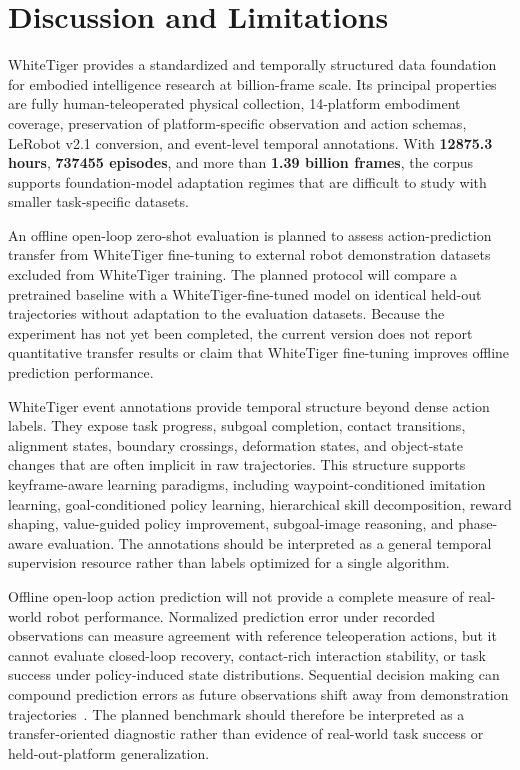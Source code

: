 \section{Discussion and Limitations}

WhiteTiger provides a standardized and temporally structured data foundation for embodied intelligence research at billion-frame scale. Its principal properties are fully human-teleoperated physical collection, 14-platform embodiment coverage, preservation of platform-specific observation and action schemas, LeRobot v2.1 conversion, and event-level temporal annotations. With \textbf{12875.3 hours}, \textbf{737455 episodes}, and more than \textbf{1.39 billion frames}, the corpus supports foundation-model adaptation regimes that are difficult to study with smaller task-specific datasets.

An offline open-loop zero-shot evaluation is planned to assess action-prediction transfer from WhiteTiger fine-tuning to external robot demonstration datasets excluded from WhiteTiger training. The planned protocol will compare a pretrained baseline with a WhiteTiger-fine-tuned model on identical held-out trajectories without adaptation to the evaluation datasets. Because the experiment has not yet been completed, the current version does not report quantitative transfer results or claim that WhiteTiger fine-tuning improves offline prediction performance.

WhiteTiger event annotations provide temporal structure beyond dense action labels. They expose task progress, subgoal completion, contact transitions, alignment states, boundary crossings, deformation states, and object-state changes that are often implicit in raw trajectories. This structure supports keyframe-aware learning paradigms, including waypoint-conditioned imitation learning, goal-conditioned policy learning, hierarchical skill decomposition, reward shaping, value-guided policy improvement, subgoal-image reasoning, and phase-aware evaluation. The annotations should be interpreted as a general temporal supervision resource rather than labels optimized for a single algorithm.

Offline open-loop action prediction will not provide a complete measure of real-world robot performance. Normalized prediction error under recorded observations can measure agreement with reference teleoperation actions, but it cannot evaluate closed-loop recovery, contact-rich interaction stability, or task success under policy-induced state distributions. Sequential decision making can compound prediction errors as future observations shift away from demonstration trajectories~\cite{ross2011dagger,zhao2023aloha}. The planned benchmark should therefore be interpreted as a transfer-oriented diagnostic rather than evidence of real-world task success or held-out-platform generalization.

